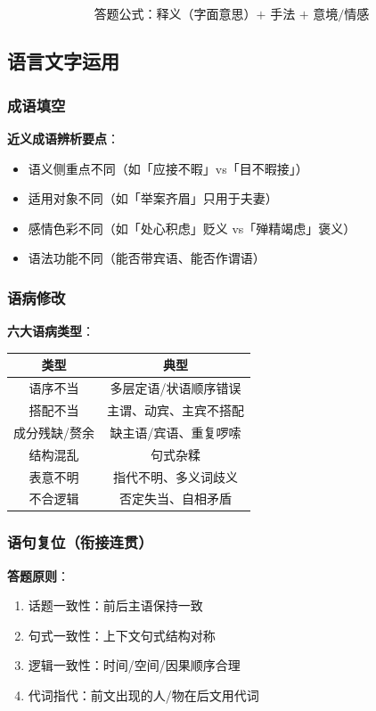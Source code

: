 \[
\text{答题公式：释义（字面意思）+ 手法 + 意境/情感}
\]

\subsection{语言文字运用}

\subsubsection{成语填空}

\textbf{近义成语辨析要点}：

\begin{itemize}
  \item 语义侧重点不同（如「应接不暇」vs「目不暇接」）
  \item 适用对象不同（如「举案齐眉」只用于夫妻）
  \item 感情色彩不同（如「处心积虑」贬义 vs「殚精竭虑」褒义）
  \item 语法功能不同（能否带宾语、能否作谓语）
\end{itemize}

\subsubsection{语病修改}

\textbf{六大语病类型}：

\begin{center}
\begin{tabular}{c|c}
\textbf{类型} & \textbf{典型} \\ \hline
语序不当 & 多层定语/状语顺序错误 \\
搭配不当 & 主谓、动宾、主宾不搭配 \\
成分残缺/赘余 & 缺主语/宾语、重复啰嗦 \\
结构混乱 & 句式杂糅 \\
表意不明 & 指代不明、多义词歧义 \\
不合逻辑 & 否定失当、自相矛盾 \\
\end{tabular}
\end{center}

\subsubsection{语句复位（衔接连贯）}

\textbf{答题原则}：

\begin{enumerate}
  \item 话题一致性：前后主语保持一致
  \item 句式一致性：上下文句式结构对称
  \item 逻辑一致性：时间/空间/因果顺序合理
  \item 代词指代：前文出现的人/物在后文用代词
\end{enumerate}

